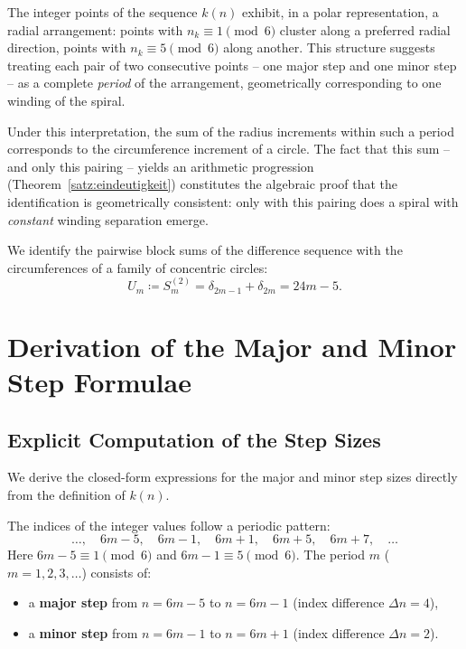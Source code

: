 \begin{tcolorbox}[
  title={Justification of the circumference identification},
  colback=blue!3,
  colframe=blue!40!black,
  enhanced,
  breakable
]
The integer points of the sequence $k(n)$ exhibit, in a polar representation,
a radial arrangement: points with $n_k \equiv 1 \pmod{6}$ cluster
along a preferred radial direction, points with $n_k \equiv 5 \pmod{6}$
along another. This structure suggests treating each pair of two consecutive
points -- one major step and one minor step -- as a complete
\emph{period} of the arrangement, geometrically corresponding to one winding
of the spiral.

Under this interpretation, the sum of the radius increments
within such a period corresponds to the circumference increment of a circle. The
fact that this sum -- and only this pairing -- yields an arithmetic
progression (Theorem~\ref{satz:eindeutigkeit}) constitutes the algebraic
proof that the identification is geometrically consistent: only with this
pairing does a spiral with \emph{constant} winding separation emerge.
\end{tcolorbox}

\begin{definition}\label{def:kreisumfaenge}
We identify the pairwise block sums of the difference sequence
with the circumferences of a family of concentric circles:
\[
  U_m \coloneqq S_m^{(2)} = \delta_{2m-1} + \delta_{2m} = 24m - 5.
\]
\end{definition}

\section{Derivation of the Major and Minor Step Formulae}
\label{sec:minor_major_herleitung}

\subsection{Explicit Computation of the Step Sizes}

We derive the closed-form expressions for the major and minor step sizes
directly from the definition of $k(n)$.

The indices of the integer values follow a periodic pattern:
\[
  \ldots,\quad 6m-5,\quad 6m-1,\quad 6m+1,\quad 6m+5,\quad 6m+7,\quad\ldots
\]
Here $6m-5 \equiv 1 \pmod{6}$ and $6m-1 \equiv 5 \pmod{6}$.
The period $m$ ($m = 1, 2, 3, \ldots$) consists of:
\begin{itemize}
  \item a \textbf{major step} from $n = 6m-5$ to $n = 6m-1$
        (index difference $\Delta n = 4$),
  \item a \textbf{minor step} from $n = 6m-1$ to $n = 6m+1$
        (index difference $\Delta n = 2$).
\end{itemize}


